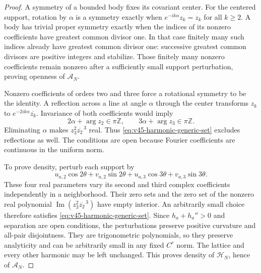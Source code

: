 \begin{proof}
A symmetry of a bounded body fixes its covariant center.  For the centered
support, rotation by $\alpha$ is a symmetry exactly when
$e^{-ik\alpha}z_k=z_k$ for all $k\ge2$.  A body has trivial proper
symmetry exactly when the indices of its nonzero coefficients have greatest
common divisor one.  In that case finitely many such indices already have
greatest common divisor one: successive greatest common divisors are
positive integers and stabilize.  Those finitely many nonzero coefficients
remain nonzero after a sufficiently small support perturbation, proving
openness of $\mathscr A_N$.

Nonzero coefficients of orders two and three force a rotational symmetry
to be the identity.  A reflection across a line at angle $\alpha$ through
the center transforms $z_k$ to $e^{-2ik\alpha}\overline{z_k}$.  Invariance
of both coefficients would imply
\[
 2\alpha+\arg z_2\in\pi\mathbb Z,
 \qquad 3\alpha+\arg z_3\in\pi\mathbb Z.
\]
Eliminating $\alpha$ makes $z_3^2\overline{z_2}^{\,3}$ real.  Thus
\eqref{eq:v45-harmonic-generic-set} excludes reflections as well.
The conditions are open because Fourier coefficients are continuous in
the uniform norm.

To prove density, perturb each support by
\[
 u_{a,2}\cos2\theta+v_{a,2}\sin2\theta+
 u_{a,3}\cos3\theta+v_{a,3}\sin3\theta.
\]
These four real parameters vary its second and third complex coefficients
independently in a neighborhood.  Their zero sets and the zero set of the
nonzero real polynomial
$\operatorname{Im}(z_3^2\overline{z_2}^{\,3})$ have empty interior.
An arbitrarily small choice therefore satisfies
\eqref{eq:v45-harmonic-generic-set}.  Since $h_a+h_a''>0$ and separation
are open conditions, the perturbations preserve positive curvature and
all-pair disjointness.  They are trigonometric polynomials, so they preserve
analyticity and can be arbitrarily small in any fixed $C^r$ norm.  The
lattice and every other harmonic may be left unchanged.  This proves
density of $\mathscr H_N$, hence of $\mathscr A_N$.
\end{proof}


